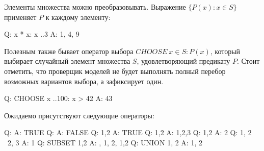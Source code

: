 \documentclass[14pt, openany]{book}
\begin{document}
Элементы множества можно преобразовывать. Выражение \(\{P(x): x \in S\}\) применяет \(P\) к каждому элементу:
\begin{tla}
  Q: {x * x: x ..3}
  A: {1, 4, 9}
\end{tla}
\begin{tlatex}
%
%
\end{tlatex}

Полезным также бывает оператор выбора \(CHOOSE~x \in S: P(x)\), который выбирает случайный элемент множества \(S\), удовлетворяющий предикату \(P\). Стоит отметить, что проверщик моделей не будет выполнять полный перебор возможных вариантов выбора, а зафиксирует один.
\begin{tla}
  Q: CHOOSE x ..100: x > 42
  A: 43
\end{tla} 
\begin{tlatex}
%
%
\end{tlatex}

Ожидаемо присутствуют следующие операторы:
\begin{tla}
  Q: {} \in {{}}
  A: TRUE
  Q: {} \notin {{}}
  A: FALSE
  Q: {1,2} 
  A: TRUE
  Q: {1,2} 
  A: {1,2,3}
  Q: {1,2} 
  A: {2}
  Q: {1, 2} \ {2, 3}
  A: {1}
  Q: SUBSET {1,2}
  A: {{}, {1}, {2}, {1,2}}
  Q: UNION {{1}, {2}}
  A: {1, 2}
\end{tla}
\begin{tlatex}
%
%
%
%
%
%
%
%
%
%
%
%
%
%
%
\end{tlatex}
\end{document}
